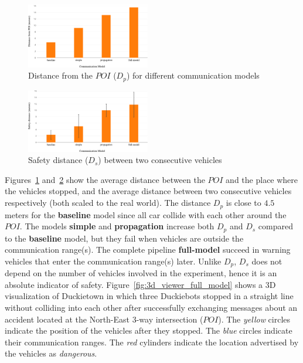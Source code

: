 \begin{figure}[t]
    \centering
    \includegraphics[width=0.48\textwidth, height=0.24\textwidth]{figures/distance_from_POI.pdf}
    \caption{Distance from the $POI$ ($D_p$) for different communication models \label{fig:distance_from_poi}}
\end{figure}

\begin{figure}[t]
    \centering
    \includegraphics[width=0.48\textwidth, height=0.24\textwidth]{figures/safety_distance.pdf}
    \caption{Safety distance ($D_s$) between two consecutive vehicles \label{fig:safety_distance}}
\end{figure}

Figures~\ref{fig:distance_from_poi} and~\ref{fig:safety_distance} show the average distance
between the $POI$ and the place where the vehicles stopped, and the average distance
between two consecutive vehicles respectively (both scaled to the real world).
The distance $D_p$ is close to $4.5$ meters for the \textbf{baseline} model since all car collide with each
other around the $POI$. The models \textbf{simple} and \textbf{propagation} increase both
$D_p$ and $D_s$ compared to the \textbf{baseline} model, but they fail when vehicles are outside the communication range(s).
The complete pipeline \textbf{full-model} succeed in warning vehicles that enter the communication range(s) later.
Unlike $D_p$, $D_s$ does not depend on the number of vehicles involved in the experiment, hence it
is an absolute indicator of safety. Figure~\ref{fig:3d_viewer_full_model} shows a 3D visualization of Duckietown
in which three Duckiebots stopped in a straight line without colliding into each other
after successfully exchanging messages about an accident located at the North-East 3-way intersection ($POI$).
The \textit{yellow} circles indicate the position of the vehicles after they stopped.
The \textit{blue} circles indicate their communication ranges. The \textit{red} cylinders
indicate the location advertised by the vehicles as \textit{dangerous}.

